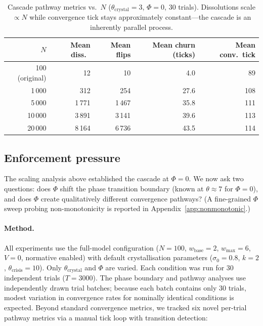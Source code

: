 \documentclass[11pt,a4paper]{article}
\begin{document}
\begin{table}[H]
\centering
\caption{Cascade pathway metrics vs.\ $N$ ($\theta_{\mathrm{crystal}} = 3$, $\Phi = 0$, 30 trials). Dissolutions scale $\propto N$ while convergence tick stays approximately constant---the cascade is an inherently parallel process.}
\label{tab:cascade_scaling}
\begin{tabular}{@{}r rrrr@{}}
\toprule
$N$ & Mean diss.\ & Mean flips & Mean churn (ticks) & Mean conv.\ tick \\
\midrule
100 (original) & 12 & 10 & 4.0 & 89 \\
1\,000  & 312   & 254   & 27.6 & 108 \\
5\,000  & 1\,771 & 1\,467 & 35.8 & 111 \\
10\,000 & 3\,891 & 3\,141 & 39.6 & 113 \\
20\,000 & 8\,164 & 6\,736 & 43.5 & 114 \\
\bottomrule
\end{tabular}
\end{table}

\subsection{Enforcement pressure}

The scaling analysis above established the cascade at $\Phi = 0$. We now ask two questions: does $\Phi$ shift the phase transition boundary (known at $\theta \approx 7$ for $\Phi = 0$), and does $\Phi$ create qualitatively different convergence pathways? (A fine-grained $\Phi$ sweep probing non-monotonicity is reported in Appendix~\ref{app:nonmonotonic}.)

\paragraph{Method.}
All experiments use the full-model configuration ($N = 100$, $w_{\mathrm{base}} = 2$, $w_{\max} = 6$, $V = 0$, normative enabled) with default crystallisation parameters ($\sigma_0 = 0.8$, $k = 2$, $\theta_{\mathrm{crisis}} = 10$). Only $\theta_{\mathrm{crystal}}$ and $\Phi$ are varied. Each condition was run for 30 independent trials ($T = 3000$). The phase boundary and pathway analyses use independently drawn trial batches; because each batch contains only 30 trials, modest variation in convergence rates for nominally identical conditions is expected. Beyond standard convergence metrics, we tracked six novel per-trial pathway metrics via a manual tick loop with transition detection:
\end{document}
